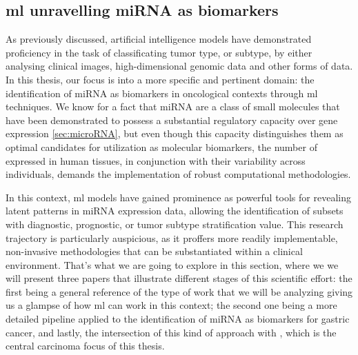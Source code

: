 
\subsection{\gls{ml} unravelling miRNA as biomarkers}

As previously discussed, artificial intelligence models have demonstrated
proficiency in the task of classificating tumor type, or subtype, by either
analysing clinical images, high-dimensional genomic data and other forms of
data. In this thesis, our focus is into a more specific and pertinent domain:
the identification of miRNA as biomarkers in oncological contexts through
\gls{ml} techniques. We know for a fact that miRNA are a class of small
molecules that have been demonstrated to possess a substantial regulatory
capacity over gene expression \ref{sec:microRNA}, but even though this capacity
distinguishes them as optimal candidates for utilization as molecular
biomarkers, the number of  expressed in human tissues, in
conjunction with their variability across individuals, demands the
implementation of robust computational methodologies.

In this context, \gls{ml} models have gained prominence as powerful tools for
revealing latent patterns in miRNA expression data, allowing the
identification of subsets with diagnostic, prognostic, or tumor subtype
stratification value. This research trajectory is particularly auspicious, as
it proffers more readily implementable, non-invasive methodologies that can be
substantiated within a clinical environment. That's what we are going to
explore in this section, where we we will present three papers that illustrate
different stages of this scientific effort: the first being a general reference
of the type of work that we will be analyzing giving us a glampse of how
\gls{ml} can work in this context; the second one being a more detailed
pipeline applied to the identification of miRNA as biomarkers for gastric
cancer, and lastly, the intersection of this kind of approach with
, which is the central carcinoma focus of this thesis.

